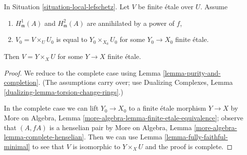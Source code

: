 \begin{lemma}
\label{lemma-lift-purity-general}
In Situation \ref{situation-local-lefschetz}.
Let $V$ be finite \'etale over $U$. Assume
\begin{enumerate}
\item $H^1_\mathfrak m(A)$ and $H^2_\mathfrak m(A)$
are annihilated by a power of $f$,
\item $V_0 = V \times_U U_0$ is equal to $Y_0 \times_{X_0} U_0$
for some $Y_0 \to X_0$ finite \'etale.
\end{enumerate}
Then $V = Y \times_X U$ for some $Y \to X$ finite \'etale.
\end{lemma}

\begin{proof}
We reduce to the complete case using Lemma \ref{lemma-purity-and-completion}.
(The assumptions carry over; use Dualizing Complexes, Lemma
\ref{dualizing-lemma-torsion-change-rings}.)

\medskip\noindent
In the complete case we can lift $Y_0 \to X_0$ to a finite \'etale
morphism $Y \to X$ by
More on Algebra, Lemma \ref{more-algebra-lemma-finite-etale-equivalence};
observe that $(A, fA)$ is a henselian pair by
More on Algebra, Lemma \ref{more-algebra-lemma-complete-henselian}.
Then we can use Lemma \ref{lemma-fully-faithful-minimal}
to see that $V$ is isomorphic to $Y \times_X U$ and
the proof is complete.
\end{proof}
